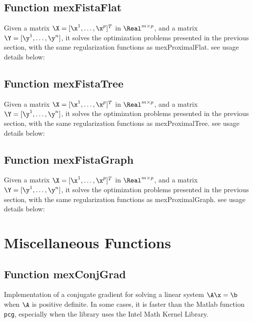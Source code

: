 \documentclass[a4paper, 11pt]{article}
\begin{document}
\subsection{Function mexFistaFlat}
Given a matrix $\X=[\x^1,\ldots,\x^p]^T$ in $\Real^{m \times p}$, and a matrix $\Y=[\y^1,\ldots,\y^n]$, it solves the optimization problems presented in the previous section, with the same regularization functions as mexProximalFlat.
see usage details below:

{\footnotesize

}

\subsection{Function mexFistaTree}
Given a matrix $\X=[\x^1,\ldots,\x^p]^T$ in $\Real^{m \times p}$, and a matrix $\Y=[\y^1,\ldots,\y^n]$, it solves the optimization problems presented in the previous section, with the same regularization functions as mexProximalTree.
see usage details below:

{\footnotesize

}

\subsection{Function mexFistaGraph}
Given a matrix $\X=[\x^1,\ldots,\x^p]^T$ in $\Real^{m \times p}$, and a matrix $\Y=[\y^1,\ldots,\y^n]$, it solves the optimization problems presented in the previous section, with the same regularization functions as mexProximalGraph.
see usage details below:

{\footnotesize

}

\section{Miscellaneous Functions}

\subsection{Function mexConjGrad}

Implementation of a conjugate gradient for solving a linear system $\A\x=\b$
when $\A$ is positive definite. In some cases, it is faster than the Matlab
function \verb|pcg|, especially when the library uses the Intel Math Kernel Library.
{\footnotesize

}
\end{document}
